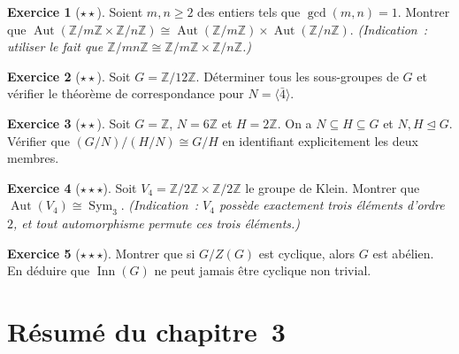 \documentclass[12pt,a4paper,openany]{book}
\theoremstyle{definition}
\newtheorem{exercice}{Exercice}[chapter]
\newcommand{\Z}{\mathbb{Z}}
\DeclareMathOperator{\Sym}{Sym}
\DeclareMathOperator{\Aut}{Aut}
\DeclareMathOperator{\Inn}{Inn}
\begin{document}
\begin{exercice}[$\star\star$]\label{exo:aut-produit}
  Soient $m,n\geq 2$ des entiers tels que $\gcd(m,n)=1$.
  Montrer que $\Aut(\Z/m\Z\times\Z/n\Z)\cong\Aut(\Z/m\Z)\times\Aut(\Z/n\Z)$.
  \textit{(Indication~: utiliser le fait que $\Z/mn\Z\cong\Z/m\Z\times\Z/n\Z$.)}
\end{exercice}

\begin{exercice}[$\star\star$]\label{exo:sous-groupes-quotient}
  Soit $G=\Z/12\Z$. Déterminer tous les sous-groupes de $G$ et
  vérifier le théorème de correspondance pour $N=\langle\bar{4}\rangle$.
\end{exercice}

\begin{exercice}[$\star\star$]\label{exo:troisieme-iso-application}
  Soit $G = \Z$, $N=6\Z$ et $H=2\Z$. On a $N\subseteq H\subseteq G$ et
  $N,H\trianglelefteq G$. Vérifier que
  $(G/N)/(H/N)\cong G/H$ en identifiant explicitement les deux
  membres.
\end{exercice}

\begin{exercice}[$\star\star\star$]\label{exo:aut-V4}
  Soit $V_4 = \Z/2\Z\times\Z/2\Z$ le groupe de Klein.
  Montrer que $\Aut(V_4)\cong\Sym_3$.
  \textit{(Indication~: $V_4$ possède exactement trois éléments
  d'ordre~$2$, et tout automorphisme permute ces trois éléments.)}
\end{exercice}

\begin{exercice}[$\star\star\star$]\label{exo:inn-cyclique}
  Montrer que si $G/Z(G)$ est cyclique, alors $G$ est abélien.
  En déduire que $\Inn(G)$ ne peut jamais être cyclique non trivial.
\end{exercice}

\section*{Résumé du chapitre~3}
\end{document}
